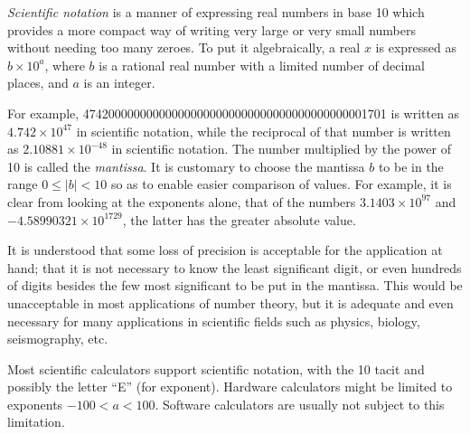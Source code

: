 \documentclass[12pt]{article}
\begin{document}
{\em Scientific notation} is a manner of expressing real numbers in base 10 which provides a more compact way of writing very large or very small numbers without needing too many zeroes. To put it algebraically, a real $x$ is expressed as $b \times 10^a$, where $b$ is a rational real number with a limited number of decimal places, and $a$ is an integer.

For example, 474200000000000000000000000000000000000000001701 is written as $4.742 \times 10^{47}$ in scientific notation, while the reciprocal of that number is written as $2.10881 \times 10^{-48}$ in scientific notation. The number multiplied by the power of 10 is called the {\em mantissa}. It is customary to choose the mantissa $b$ to be in the range $0 \le |b| < 10$ so as to enable easier comparison of values. For example, it is clear from looking at the exponents alone, that of the numbers $3.1403 \times 10^{97}$ and $-4.58990321 \times 10^{1729}$, the latter has the greater absolute value.

It is understood that some loss of precision is acceptable for the application at hand; that it is not necessary to know the least significant digit, or even hundreds of digits besides the few most significant to be put in the mantissa. This would be unacceptable in most applications of number theory, but it is adequate and even necessary for many applications in scientific fields such as physics, biology, seismography, etc.

Most scientific calculators support scientific notation, with the 10 tacit and possibly the letter ``E'' (for exponent). Hardware calculators might be limited to exponents $-100 < a < 100$. Software calculators are usually not subject to this limitation.
\end{document}

